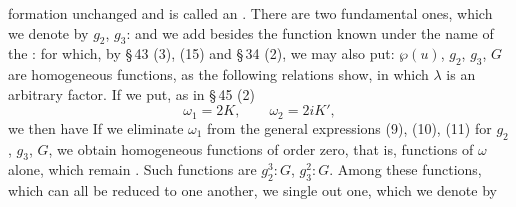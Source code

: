 formation unchanged and is called an . There are two fundamental ones,
which we denote by $g_2$, $g_3$:
and we add besides the function known under the name of the :
for which, by §\,43 (3), (15) and §\,34 (2), we may also put:
$\wp(u)$, $g_2$, $g_3$, $G$ are homogeneous functions, as the following relations show, in which
$\lambda$ is an arbitrary factor.
If we put, as in §\,45 (2)
\[ \omega_1 = 2K, \qquad \omega_2 = 2iK', \]
we then have
If we eliminate $\omega_1$ from the general expressions (9), (10), (11) for $g_2$, $g_3$, $G$,
we obtain homogeneous functions of order zero, that is, functions of $\omega$ alone, which remain
. Such functions are $g_2^3:G$, $g_3^2:G$. Among these
functions, which can all be reduced to one another, we single out one, which we denote by
